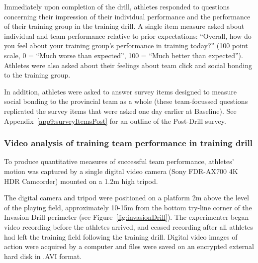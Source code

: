\begin{CJK}{UTF8}{gbsn}

Immediately upon completion of the drill, athletes responded to questions concerning their impression of their individual performance and the performance of their training group in the training drill. A  single item measure asked about individual and team performance relative to prior expectations: ``Overall, how do you feel about your training group's performance in training today?'' (100 point scale, 0 = ``Much worse than expected'', 100 = ``Much better than expected'').  Athletes were also asked about their feelings about team click and social bonding to the training group.

In addition, athletes were asked to answer survey items designed to measure social bonding to the provincial team as a whole (these team-focussed questions replicated the survey items that were asked one day earlier at Baseline).  See Appendix~\ref{app9:surveyItemsPost} for an outline of the Post-Drill survey.



\subsubsection{Video analysis of training team performance in training drill\label{sec:videoAnalysis}}
To produce quantitative measures of successful team performance, athletes' motion was captured by a single digital video camera (Sony FDR-AX700 4K HDR Camcorder) mounted on a 1.2m high tripod.

The digital camera and tripod were positioned on a platform 2m above the level of the playing field, approximately 10-15m from the bottom try-line corner of the Invasion Drill perimeter (see Figure~\ref{fig:invasionDrill}). The experimenter began video recording before the athletes arrived, and ceased recording after all athletes had left the training field following the training drill. Digital video images of action were acquired by a computer and files were saved on an encrypted external hard disk in .AVI format.



\end{CJK}
